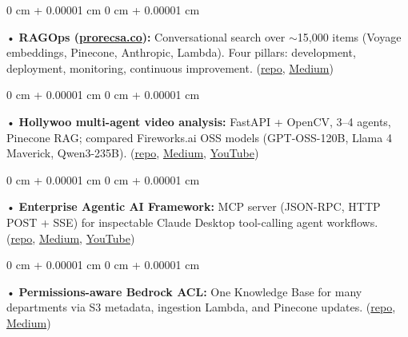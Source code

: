 \documentclass[10pt, letterpaper]{article}
\newenvironment{onecolentry}{
    \begin{adjustwidth}{
        0 cm + 0.00001 cm
    }{
        0 cm + 0.00001 cm
    }
}{
    \end{adjustwidth}
} %
\begin{document}
\begin{onecolentry}
     • \textbf{RAGOps (\href{https://prorecsa.co}{prorecsa.co}):} Conversational search over $\sim$15,000 items (Voyage embeddings, Pinecone, Anthropic, Lambda). Four pillars: development, deployment, monitoring, continuous improvement. (\href{https://github.com/daedalus-s/ragops-doc}{repo}, \href{https://medium.com/@sreenikethaathreya/from-rags-to-riches-bba8a671d5e6}{Medium})
\end{onecolentry}
\begin{onecolentry}
     • \textbf{Hollywoo multi-agent video analysis:} FastAPI + OpenCV, 3--4 agents, Pinecone RAG; compared Fireworks.ai OSS models (GPT-OSS-120B, Llama 4 Maverick, Qwen3-235B). (\href{https://github.com/daedalus-s/fireworks-video-discussion}{repo}, \href{https://medium.com/@sreenikethaathreya/hollywoo-ai-video-analysis-5eae37ca7e16}{Medium}, \href{https://www.youtube.com/watch?v=KBs_3V0OAgU}{YouTube})
\end{onecolentry}
\begin{onecolentry}
     • \textbf{Enterprise Agentic AI Framework:} MCP server (JSON-RPC, HTTP POST + SSE) for inspectable Claude Desktop tool-calling agent workflows. (\href{https://github.com/daedalus-s/dota2-mcp-server}{repo}, \href{https://medium.com/@sreenikethaathreya/get-good-at-using-ai-noob-5d2576203112}{Medium}, \href{https://www.youtube.com/watch?v=op2gTYyFb5U}{YouTube})
\end{onecolentry}
\begin{onecolentry}
     • \textbf{Permissions-aware Bedrock ACL:} One Knowledge Base for many departments via S3 metadata, ingestion Lambda, and Pinecone updates. (\href{https://github.com/daedalus-s/bedrock-acl-metadata}{repo}, \href{https://medium.com/@sreenikethaathreya/building-a-permission-aware-genai-application-on-amazon-bedrock-8fdc2410dd43}{Medium})
\end{onecolentry}
\vspace{2 pt}
        \vspace{2 pt }
\end{document}
